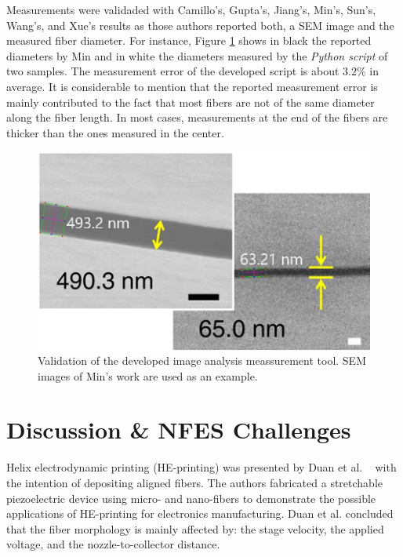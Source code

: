 Measurements were validaded with Camillo's, Gupta's, Jiang's, Min's, Sun's, Wang's, and Xue's \cite{Camillo2013, Gupta2007, Jiang2018, Min2013, Sun2006a, Wang2015, Xue2014} results as those authors reported both, a SEM image and the measured fiber diameter. For instance, Figure \ref{fig:imageAnalysisToolValidation} shows in black the reported diameters by Min and in white the diameters measured by the \emph{Python script} of two samples. The measurement error of the developed script is about $3.2\%$ in average. It is considerable to mention that the reported measurement error is mainly contributed to the fact that most fibers are not of the same diameter along the fiber length. In most cases, measurements at the end of the fibers are thicker than the ones measured in the center.

\begin{figure}[!th]
\centering
\includegraphics[scale=0.8]{./Figures/imageAnalysisToolValidation.png}
\decoRule
\caption[Validation of the developed image analysis meassurement tool]{{Validation of the developed image analysis meassurement tool. SEM images of Min's work are used as an example. \cite{Min2013}}}
\label{fig:imageAnalysisToolValidation}
\end{figure}

\section{Discussion \& NFES Challenges}
\label{sec:parametersThatAffectTheDiameter}

Helix electrodynamic printing (HE-printing) was presented by Duan et al. \unskip~\cite{527120:11974308} with the intention of depositing aligned fibers. The authors fabricated a stretchable piezoelectric device using micro- and nano-fibers to demonstrate the possible applications of HE-printing for electronics manufacturing. Duan et al. concluded that the fiber morphology is mainly affected by: the stage velocity, the applied voltage, and the nozzle-to-collector distance.


